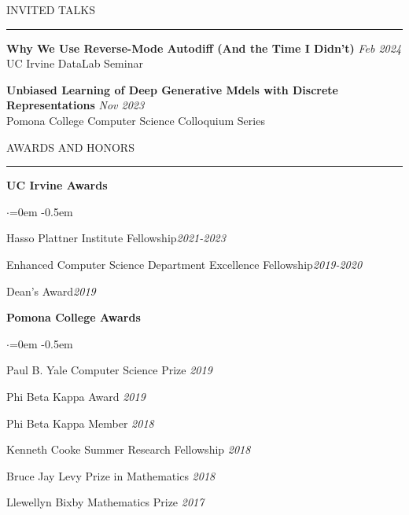\documentclass{resume} %
\renewenvironment{rSection}[1]{
\sectionskip
\textcolor{CarnegieMellonRed}{\MakeUppercase{#1}}
\sectionlineskip
\hrule
\begin{list}{}{
\setlength{\leftmargin}{1.5em}
}
\item[]
}{
\end{list}
}
\begin{document}
\begin{rSection}{Invited Talks}	
{\bf Why We Use Reverse-Mode Autodiff (And the Time I Didn't)} \hfill {\em Feb 2024}\\
UC Irvine DataLab Seminar \vspace{1.em}

{\bf Unbiased Learning of Deep Generative Mdels with Discrete Representations} \hfill {\em Nov 2023}\\
Pomona College Computer Science Colloquium Series

\end{rSection}
\newpage
\begin{rSection}{Awards and Honors}	
{\bf UC Irvine Awards}
\begin{list}{$\cdot$}{\leftmargin=0em} 
    \itemsep -0.5em \vspace{-0.5em}
\item Hasso Plattner Institute Fellowship\hfill {\em 2021-2023}
\item Enhanced Computer Science Department Excellence Fellowship\hfill {\em 2019-2020}
\item Dean's Award\hfill {\em 2019} 
\end{list} \vspace{0.5em}

{\bf Pomona College Awards}
\begin{list}{$\cdot$}{\leftmargin=0em} 
    \itemsep -0.5em \vspace{-0.5em}
\item Paul B. Yale Computer Science Prize \hfill {\em 2019}
\item Phi Beta Kappa Award \hfill {\em 2019}
\item Phi Beta Kappa Member  \hfill {\em 2018}
\item Kenneth Cooke Summer Research Fellowship \hfill {\em 2018}
\item Bruce Jay Levy Prize in Mathematics \hfill {\em 2018}
\item Llewellyn Bixby Mathematics Prize  \hfill {\em 2017}
\end{list}
\end{rSection}
\end{document}
